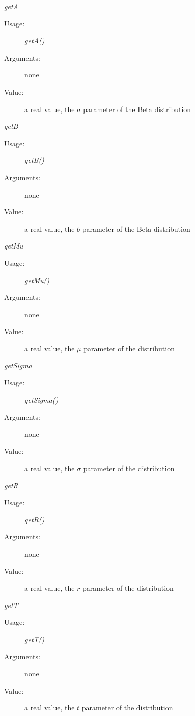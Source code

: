 \begin{description}
\begin{description}
\item \textit{getA}
\begin{description}
\item[Usage:] \textit{getA()}
\item[Arguments:] none
\item[Value:]  a real value, the $a$ parameter of the Beta distribution
\end{description}
\bigskip
\item \textit{getB}
\begin{description}
\item[Usage:] \textit{getB()}
\item[Arguments:] none
\item[Value:]  a real value, the  $b$ parameter of the Beta distribution
\end{description}
\bigskip
\item \textit{getMu}
\begin{description}
\item[Usage:] \textit{getMu()}
\item[Arguments:] none
\item[Value:]  a real value,  the $\mu$ parameter of the  distribution
\end{description}
\bigskip
\item \textit{getSigma}
\begin{description}
\item[Usage:] \textit{getSigma()}
\item[Arguments:] none
\item[Value:]  a real value,  the $\sigma$ parameter of the  distribution
\end{description}
\bigskip
\item \textit{getR}
\begin{description}
\item[Usage:] \textit{getR()}
\item[Arguments:] none
\item[Value:]  a real value,  the $r$ parameter of the  distribution
\end{description}
\bigskip
\item \textit{getT}
\begin{description}
\item[Usage:] \textit{getT()}
\item[Arguments:] none
\item[Value:]  a real value,  the $t$ parameter of the  distribution
\end{description}
\bigskip


\end{description}
\end{description}

